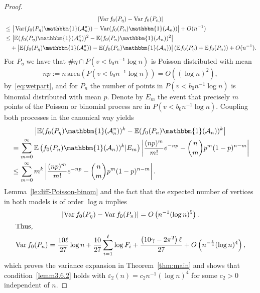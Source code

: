 \documentclass[10pt]{amsart}
\theoremstyle{definition}\newtheorem{defi}[theo]{Definition}\newtheorem{rema}[theo]{Remark}\newtheorem{exam}[theo]{Example}\newtheorem{exem}[theo]{Example}\newtheorem{nota}[theo]{Notation}
\newcommand{\ind}{\mathbbm{1}}
\newcommand{\var}{\operatorname{Var}}
\newcommand{\bbE}{\mathbb{E}}
\newcommand{\clA}{\mathcal{A}}
\newcommand{\area}{\mathrm{area}}
\begin{document}
\begin{proof}
\begin{multline*}
\left| \var f_0(P_\eta)  - \var f_0(P_n)\right|\\
\begin{aligned}
&\leq  \big| \var (f_0(P_\eta) \ind(\clA^\pi_n)) - \var (f_0(P_n) \ind(\clA_n)) \big| + O(n^{-1})\\
&\leq \left| \bbE (f_0(P_\eta) \ind(\clA^\pi_n))^2 - \bbE (f_0(P_n) \ind(\clA_n))^2 \right|\\
& \quad + \big| \bbE (f_0(P_\eta) \ind(\clA^\pi_n)) - \bbE (f_0(P_n) \ind(\clA_n)) \big| \left(\bbE f_0(P_\eta) + \bbE f_0(P_n) \right) + O(n^{-1}).
\end{aligned}
\end{multline*}
For $P_\eta$ we have that $\# \eta \cap P(v< b_0 n^{-1} \log n)$ is Poisson distributed with mean
\[
np := n\, {\area}\left(P(v< b_0 n^{-1} \log n)\right) = O\left((\log n)^2\right),
\]
by~\eqref{eq:wetpart}, and for $P_n$ the number of points in $P(v< b_0 n^{-1} \log n)$ is binomial distributed with mean $p$. Denote by $E_m$ the event that precisely $m$ points of the Poisson or binomial process are in $P(v< b_0 n^{-1} \log n)$. Coupling both processes in the canonical way yields
\begin{multline*}
\big| \bbE (f_0(P_\eta) \ind(\clA^\pi_n))^k - \bbE (f_0(P_n) \ind(\clA_n))^k\big|
\\
\begin{aligned}
& =\sum_{m=0}^\infty \bbE \left(f_0(P_n) \ind(\clA_n))^k | E_m\right) \left|\frac {(np)^m}{m!} e^{-np} - \binom{n}{m} p^m (1-p)^{n-m} \right|
\\ & \leq
\sum_{m=0}^\infty m^k \left|\frac {(np)^m}{m!} e^{-np} - \binom{n}{m} p^m (1-p)^{n-m} \right|.
\end{aligned}
\end{multline*}
Lemma~\ref{le:diff-Poisson-binom} and the fact that the expected number of vertices in both models is of order $\log n$ implies
\begin{gather*}
\left| \var f_0(P_\eta) - \var f_0(P_n) \right|  = O\left(n^{-1} (\log n)^5\right).
\\
\intertext{Thus,}
\var f_0(P_n) = \frac{10 \ell}{27}\log n +\frac{10}{27}\sum_{i=1}^\ell \log F_i +\frac{\left(10 \gamma -2 \pi^2\right)\ell }{27} + O\left(n^{-\frac 14} (\log n)^4\right),
\end{gather*}
which proves the variance expansion in Theorem~\eqref{thm:main} and shows that condition~\eqref{lemm3.6.2} holds with $\varepsilon_2(n)=c_2 n^{-1} (\log n)^4$ for some $c_2>0$ independent of $n$.


\end{proof}
\end{document}

